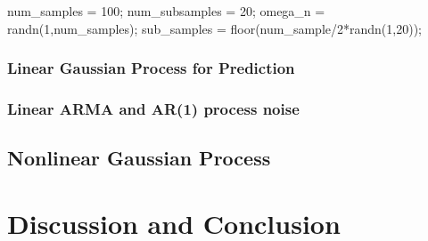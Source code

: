 \documentclass[11pt, twoside]{article}   	%
\newenvironment{matlab}{\comment}{\endcomment}
\begin{document}
\begin{matlab}
num_samples = 100;
num_subsamples = 20;
omega_n = randn(1,num_samples);
sub_samples = floor(num_sample/2*randn(1,20));
\end{matlab}

\subsubsection{Linear Gaussian Process for Prediction}
\subsubsection{Linear ARMA and AR(1) process noise}
\subsection{Nonlinear Gaussian Process}

\section{Discussion and Conclusion}



\end{document}
